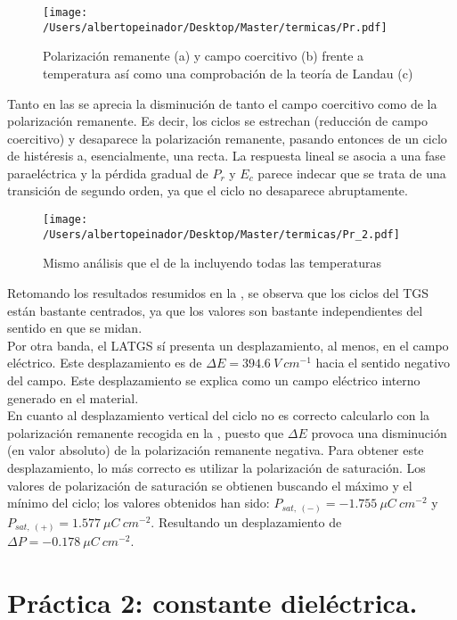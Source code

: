 \documentclass[a4paper, 12pt, spanish]{article}
\begin{document}
\begin{multicols}{2}
\begin{figure}[H]
    \centering
    \texttt{[image: /Users/albertopeinador/Desktop/Master/termicas/Pr.pdf]}
    \caption{Polarización remanente (a) y campo coercitivo (b) frente a temperatura así como una comprobación de la teoría de Landau (c)}\label{fig:param1}
\end{figure}
Tanto en las  se aprecia la disminución de tanto el campo coercitivo como de la polarización remanente. Es decir, los ciclos se estrechan (reducción de campo coercitivo) y desaparece la polarización remanente, pasando entonces de un ciclo de histéresis a, esencialmente, una recta. La respuesta lineal se asocia a una fase paraeléctrica y la pérdida gradual de $P_r$ y $E_c$ parece indecar que se trata de una transición de segundo orden, ya que el ciclo no desaparece abruptamente.
\begin{figure}[H]
    \centering
    \texttt{[image: /Users/albertopeinador/Desktop/Master/termicas/Pr\_2.pdf]}
    \caption{Mismo análisis que el de la  incluyendo todas las temperaturas}\label{fig:Pr2}
\end{figure}

Retomando los resultados resumidos en la , se observa que los ciclos del TGS están bastante centrados, ya que los valores son bastante independientes del sentido en que se midan.\\
Por otra banda, el LATGS sí presenta un desplazamiento, al menos, en el campo eléctrico. Este desplazamiento es de $\Delta E = 394.6\ V\ cm^{-1}$ hacia el sentido negativo del campo. Este desplazamiento se explica como un campo eléctrico interno generado en el material.\\
En cuanto al desplazamiento vertical del ciclo no es correcto calcularlo con la polarización remanente recogida en la , puesto que $\Delta E$ provoca una disminución (en valor absoluto) de la polarización remanente negativa. Para obtener este desplazamiento, lo más correcto es utilizar la polarización de saturación. Los valores de polarización de saturación se obtienen buscando el máximo y el mínimo del ciclo; los valores obtenidos han sido: $P_{sat,\ (-)} = -1.755\ \mu C\ cm^{-2}$ y $P_{sat,\ (+)} = 1.577\ \mu C\ cm^{-2}$. Resultando un desplazamiento de $\Delta P = -0.178\ \mu C\ cm^{-2}$.

\section{Práctica 2: constante dieléctrica.}

\end{multicols}
\end{document}
